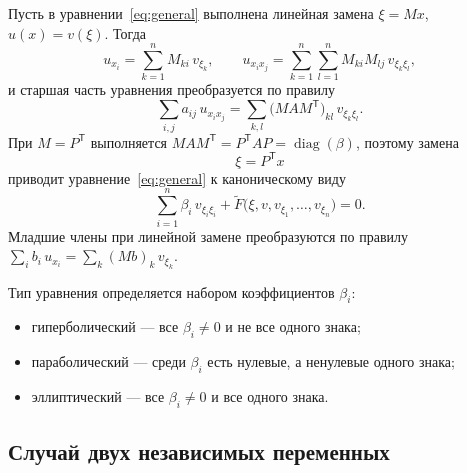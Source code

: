 \documentclass[a4paper,12pt]{article}
\DeclareMathOperator{\diag}{diag}
\begin{document}
Пусть в уравнении~\eqref{eq:general} выполнена линейная замена $\xi=Mx$,
$u(x)=v(\xi)$. Тогда
\[
  u_{x_i}=\sum_{k=1}^{n}M_{ki}\,v_{\xi_k},\qquad
  u_{x_ix_j}=\sum_{k=1}^{n}\sum_{l=1}^{n}M_{ki}M_{lj}\,v_{\xi_k\xi_l},
\]
и старшая часть уравнения преобразуется по правилу
\[
  \sum_{i,j}a_{ij}\,u_{x_ix_j}=\sum_{k,l}\bigl(MAM^{\mathsf T}\bigr)_{kl}\,v_{\xi_k\xi_l}.
\]
При $M=P^{\mathsf T}$ выполняется $MAM^{\mathsf T}=P^{\mathsf T}\!AP=\diag(\beta)$,
поэтому замена
\begin{equation}\label{eq:subst}
  \xi=P^{\mathsf T}x
\end{equation}
приводит уравнение~\eqref{eq:general} к каноническому виду
\begin{equation}\label{eq:can}
  \sum_{i=1}^{n}\beta_i\,v_{\xi_i\xi_i}
  +\tilde F\bigl(\xi,v,v_{\xi_1},\dots,v_{\xi_n}\bigr)=0.
\end{equation}
Младшие члены при линейной замене преобразуются по правилу
$\sum_i b_i\,u_{x_i}=\sum_k (Mb)_k\,v_{\xi_k}$.

Тип уравнения определяется набором коэффициентов $\beta_i$:
\begin{itemize}
  \item гиперболический --- все $\beta_i\neq0$ и не все одного знака;
  \item параболический --- среди $\beta_i$ есть нулевые, а ненулевые одного знака;
  \item эллиптический --- все $\beta_i\neq0$ и все одного знака.
\end{itemize}

\subsection{Случай двух независимых переменных}
\label{ss:2d}
\end{document}
